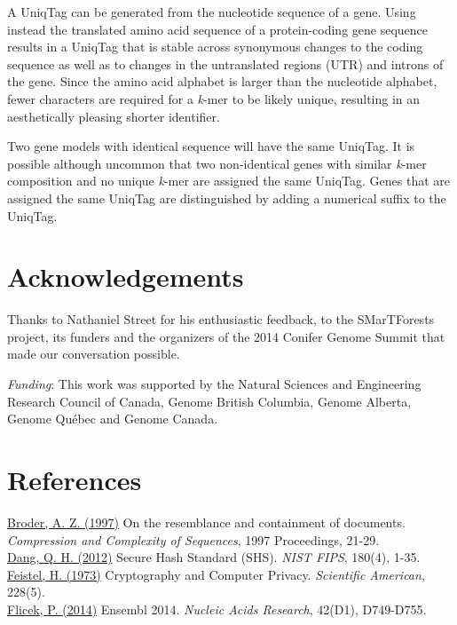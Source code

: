 \documentclass{bioinfo}
\begin{document}
A UniqTag can be generated from the nucleotide sequence of a gene. Using
instead the translated amino acid sequence of a protein-coding gene
sequence results in a UniqTag that is stable across synonymous changes
to the coding sequence as well as to changes in the untranslated regions
(UTR) and introns of the gene. Since the amino acid alphabet is larger
than the nucleotide alphabet, fewer characters are required for a
\emph{k}-mer to be likely unique, resulting in an aesthetically pleasing
shorter identifier.

Two gene models with identical sequence will have the same UniqTag. It
is possible although uncommon that two non-identical genes with similar
\emph{k}-mer composition and no unique \emph{k}-mer are assigned the
same UniqTag. Genes that are assigned the same UniqTag are distinguished
by adding a numerical suffix to the UniqTag.

\section*{Acknowledgements}\label{acknowledgements}

Thanks to Nathaniel Street for his enthusiastic feedback, to the
SMarTForests project, its funders and the organizers of the 2014 Conifer
Genome Summit that made our conversation possible.

\emph{Funding}: This work was supported by the Natural Sciences and
Engineering Research Council of Canada, Genome British Columbia, Genome
Alberta, Genome Québec and Genome Canada.

\section*{References}\label{references}

\href{http://dx.doi.org/10.1109/SEQUEN.1997.666900}{Broder, A. Z.
(1997)} On the resemblance and containment of documents.
\emph{Compression and Complexity of Sequences}, 1997 Proceedings,
21-29.\\\href{http://www.nist.gov/manuscript-publication-search.cfm?pub_id=910977}{Dang,
Q. H. (2012)} Secure Hash Standard (SHS). \emph{NIST FIPS}, 180(4),
1-35.\\\href{http://www.scientificamerican.com/article/cryptography-and-computer-privacy/}{Feistel,
H. (1973)} Cryptography and Computer Privacy. \emph{Scientific
American}, 228(5).\\\href{http://dx.doi.org/10.1093/nar/gkt1196}{Flicek,
P. (2014)} Ensembl 2014. \emph{Nucleic Acids Research}, 42(D1),
D749-D755.
\end{document}
